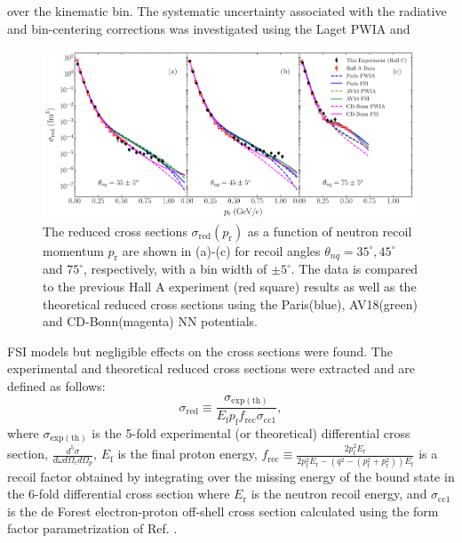 over the kinematic bin. The systematic uncertainty associated with the radiative and bin-centering corrections was investigated using the Laget PWIA and 
\onecolumngrid
\begin{center}
\begin{figure}
\includegraphics[scale=0.46]{prl_plots/PRL_plot1.pdf}
\caption{The reduced cross sections $\sigma_{\mathrm{red}}(p_{\mathrm{r}})$ as a function of neutron recoil momentum $p_{\mathrm{r}}$ are shown in (a)-(c) for recoil angles $\theta_{nq}=35^{\circ}, 45^{\circ}$ and $75^{\circ}$, respectively,
with a bin width of $\pm 5^{\circ}$. The data is compared to the previous Hall A experiment (red square) results \cite{PhysRevLett.107.262501} as well as the theoretical reduced cross sections using the Paris(blue),
AV18(green) and CD-Bonn(magenta) NN potentials.}
\label{fig:fig1}
\end{figure}
\end{center}
\twocolumngrid
\noindent FSI models but negligible effects on the cross sections were found. The experimental and theoretical reduced cross sections were extracted and are defined as follows:
\begin{equation}
\sigma_{\mathrm{red}} \equiv \frac{\sigma_{\mathrm{exp(th)}}}{E_{\mathrm{f}}p_{\mathrm{f}}f_{\mathrm{rec}}\sigma_{\mathrm{cc1}}},
\label{eq:1}
\end{equation}
\noindent where $\sigma_{\mathrm{exp(th)}}$ is the 5-fold experimental (or theoretical) differential cross section, $\frac{d^{5}\sigma}{d\omega d\Omega_{e} d\Omega_{p}}$,
$E_{\mathrm{f}}$ is the final proton energy, $f_{\mathrm{rec}}\equiv \frac{2p_{\mathrm{f}}^{2}E_{\mathrm{r}}}{2p_{\mathrm{f}}^{2}E_{\mathrm{r}} - (q^{2} - (p_{\mathrm{f}}^{2} + p_{\mathrm{r}}^{2}))E_{\mathrm{f}}}$
is a recoil factor obtained by integrating over the missing energy of the bound state in the 6-fold differential cross section where $E_{\mathrm{r}}$ is the neutron recoil energy, and $\sigma_{\mathrm{cc1}}$ is the
de Forest \cite{DEFOREST1983} electron-proton off-shell cross section calculated using the form factor parametrization of Ref. \cite{PhysRevC.69.022201}.
